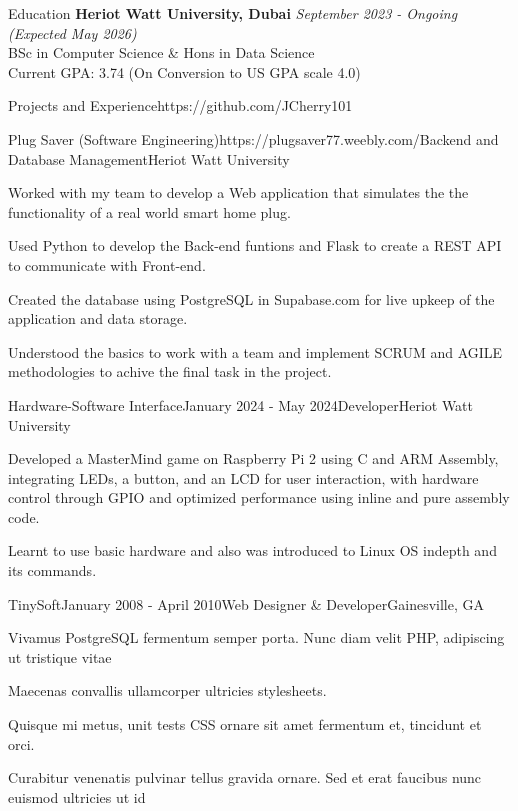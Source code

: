 \documentclass{resume}
\begin{document}
  \begin{rSection}{Education}
    {\bf Heriot Watt University, Dubai} \hfill {\em September 2023 - Ongoing (Expected May 2026)} \\ 
    { BSc in Computer Science \& Hons in Data Science} \smallskip \\
    Current GPA: 3.74 (On Conversion to US GPA scale 4.0)
  \end{rSection}
  
  \begin{rSection}{Projects and Experience}{https://github.com/JCherry101}
  
    \begin{rSubsection}{Plug Saver (Software Engineering)}{https://plugsaver77.weebly.com/}{Backend and Database Management}{Heriot Watt University}
    \item Worked with my team to develop a Web application that simulates the the functionality of a real world smart home plug.
    \item Used Python to develop the Back-end funtions and Flask to create a REST API to communicate with Front-end.
    \item Created the database using PostgreSQL in Supabase.com for live upkeep of the application and data storage.
    \item Understood the basics to work with a team and implement SCRUM and AGILE methodologies to achive the final task in the project.
    \end{rSubsection}
  
    \begin{rSubsection}{Hardware-Software Interface}{January 2024 - May 2024}{Developer}{Heriot Watt University}
    \item Developed a MasterMind game on Raspberry Pi 2 using C and ARM Assembly, integrating LEDs, a button, and an LCD for user interaction, with hardware control through GPIO and optimized performance using inline and pure assembly code.
    \item Learnt to use basic hardware and also was introduced to Linux OS indepth and its commands.
    \end{rSubsection}

    \begin{rSubsection}{TinySoft}{January 2008 - April 2010}{Web Designer \& Developer}{Gainesville, GA}
    \item Vivamus PostgreSQL fermentum semper porta. Nunc diam velit PHP, adipiscing ut tristique vitae
    \item Maecenas convallis ullamcorper ultricies stylesheets.
    \item Quisque mi metus, unit tests CSS ornare sit amet fermentum et, tincidunt et orci.
    \item Curabitur venenatis pulvinar tellus gravida ornare. Sed et erat faucibus nunc euismod ultricies ut id
    \end{rSubsection}
  
  \end{rSection}
  
\end{document}

